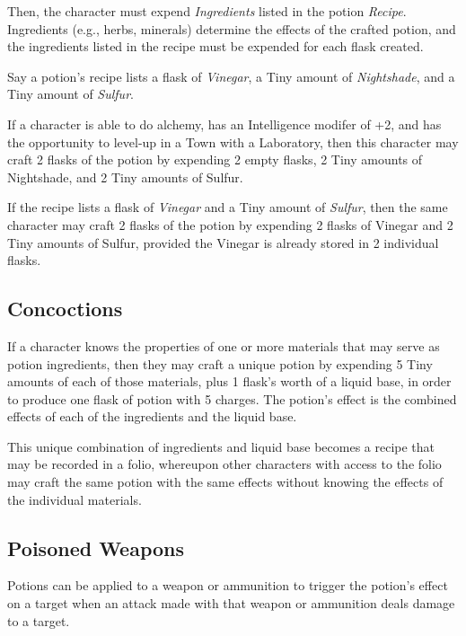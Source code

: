 Then, the character must expend \textit{Ingredients} listed in the potion \textit{Recipe}.
Ingredients (e.g., herbs, minerals) determine the effects of the crafted potion,
and the ingredients listed in the recipe must be expended for each flask created.

\begin{Example}
  Say a potion's recipe lists a flask of \textit{Vinegar}, 
  a Tiny amount of \textit{Nightshade}, and a Tiny amount of \textit{Sulfur}.

  \vspace{0.4em}

  If a character is able to do alchemy, has an Intelligence modifer of +2,
  and has the opportunity to level-up in a Town with a Laboratory,
  then this character may craft 2 flasks of the potion by expending 2 empty flasks,
  2 Tiny amounts of Nightshade, and 2 Tiny amounts of Sulfur.

  \vspace{0.4em}

  If the recipe lists a flask of \textit{Vinegar} and a Tiny amount of \textit{Sulfur},
  then the same character may craft 2 flasks of the potion by expending 2 flasks of Vinegar
  and 2 Tiny amounts of Sulfur, provided the Vinegar is already stored in 2 individual flasks.
\end{Example}


\subsection{Concoctions}
If a character knows the properties of one or more materials that may serve as potion ingredients,
then they may craft a unique potion by expending 5 Tiny amounts of each of those materials,
plus 1 flask's worth of a liquid base, in order to produce one flask of potion with 5 charges.
The potion's effect is the combined effects of each of the ingredients and the liquid base.

\vspace{0.4em}

This unique combination of ingredients and liquid base becomes a recipe that may be recorded in a folio,
whereupon other characters with access to the folio may craft the same potion with the same effects
without knowing the effects of the individual materials.

\newpage

\subsection{Poisoned Weapons}
Potions can be applied to a weapon or ammunition to trigger the potion's effect on a target 
when an attack made with that weapon or ammunition deals damage to a target.

